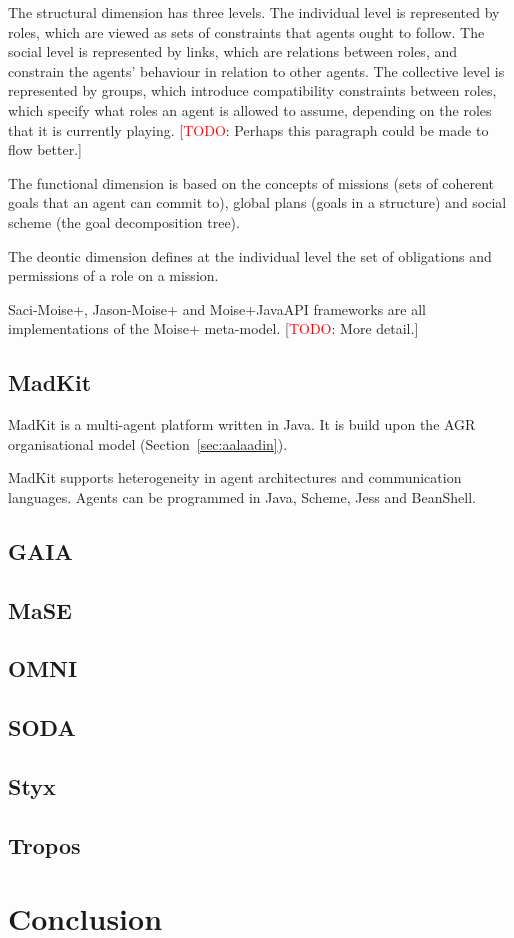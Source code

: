 \documentclass{article}
\newcommand{\todo}[1]{[\textcolor{red}{TODO}: #1]}
\begin{document}
The structural dimension has three levels. The individual level
is represented by roles, which are viewed as sets of constraints
that agents ought to follow. The social level is represented
by links, which are relations between roles, and constrain the
agents' behaviour in relation to other agents. The collective
level is represented by groups, which introduce compatibility
constraints between roles, which specify what roles an agent is
allowed to assume, depending on the roles that it is currently
playing. \todo{Perhaps this paragraph could be made to flow
better.}

The functional dimension is based on the concepts of missions
(sets of coherent goals that an agent can commit to), global
plans (goals in a structure) and social scheme (the goal
decomposition tree). 

The deontic dimension defines at the individual level the set of
obligations and permissions of a role on a mission.

Saci-Moise+, Jason-Moise+ and Moise+JavaAPI frameworks are all
implementations of the Moise+ meta-model. \todo{More detail.}

\subsection{MadKit} 

MadKit is a multi-agent platform written in Java. It is build upon
the AGR organisational model (Section~\ref{sec:aalaadin}).

MadKit supports heterogeneity in agent architectures and
communication languages. Agents can be programmed in Java,
Scheme, Jess and BeanShell.

\subsection{GAIA}
\subsection{MaSE}
\subsection{OMNI}
\subsection{SODA}
\subsection{Styx}
\subsection{Tropos}
\section{Conclusion}



\end{document}
